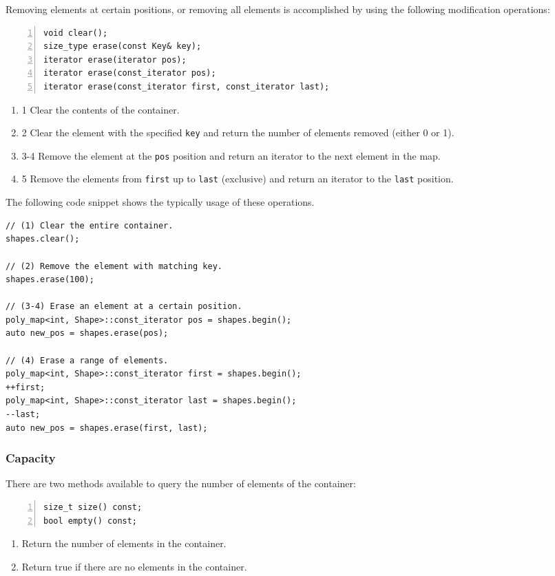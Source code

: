 \documentclass[10pt,a4paper,openany]{mudbook}
\newenvironment{enumeratedef}
  {\begin{enumerate}[topsep=0.5em,itemsep=0em,parsep=0em,font=\small]
     \small}
  {\end{enumerate}}
\begin{document}
Removing elements at certain positions, or removing all elements is
accomplished by using the following modification operations:
\begin{lstlisting}[style=definition,numbers=left]
void clear();
size_type erase(const Key& key);
iterator erase(iterator pos);
iterator erase(const_iterator pos);
iterator erase(const_iterator first, const_iterator last);
\end{lstlisting}
\begin{enumeratedef}
  \item[1] Clear the contents of the container.
  \item[2] Clear the element with the specified \texttt{key} and return the
           number of elements removed (either 0 or 1).
  \item[3-4] Remove the element at the \texttt{pos} position and return an
           iterator to the next element in the map.
  \item[5] Remove the elements from \texttt{first} up to \texttt{last}
           (exclusive) and return an iterator to the \texttt{last} position.
\end{enumeratedef}

The following code snippet shows the typically usage of these operations.

\begin{lstlisting}[style=snippet]
// (1) Clear the entire container.
shapes.clear();

// (2) Remove the element with matching key.
shapes.erase(100);

// (3-4) Erase an element at a certain position.
poly_map<int, Shape>::const_iterator pos = shapes.begin();
auto new_pos = shapes.erase(pos);

// (4) Erase a range of elements.
poly_map<int, Shape>::const_iterator first = shapes.begin();
++first;
poly_map<int, Shape>::const_iterator last = shapes.begin();
--last;
auto new_pos = shapes.erase(first, last);
\end{lstlisting}

\subsubsection{Capacity}

There are two methods available to query the number of elements of the
container:
\begin{lstlisting}[style=definition,numbers=left]
size_t size() const;
bool empty() const;
\end{lstlisting}
\begin{enumeratedef}
  \item Return the number of elements in the container.
  \item Return true if there are no elements in the container.
\end{enumeratedef}
\end{document}
